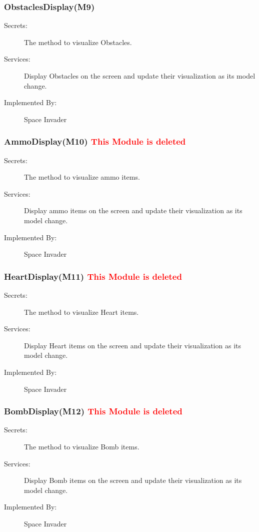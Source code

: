 \documentclass[12pt]{article}
\begin{document}
\subsubsection{ObstaclesDisplay(M9)}
\begin{description}
\item[Secrets:] The method to visualize Obstacles.
\item[Services:] Display Obstacles on the screen and update their visualization as its model change.
\item[Implemented By:] Space Invader
\end{description}

\subsubsection{AmmoDisplay(M10) \textcolor{red}{This Module is deleted}}
\begin{description}
\item[Secrets:] The method to visualize ammo items.
\item[Services:] Display ammo items on the screen and update their visualization as its model change.
\item[Implemented By:] Space Invader
\end{description}

\subsubsection{HeartDisplay(M11) \textcolor{red}{This Module is deleted}}
\begin{description}
\item[Secrets:] The method to visualize Heart items.
\item[Services:] Display Heart items on the screen and update their visualization as its model change.
\item[Implemented By:] Space Invader
\end{description}

\subsubsection{BombDisplay(M12) \textcolor{red}{This Module is deleted}}
\begin{description}
\item[Secrets:] The method to visualize Bomb items.
\item[Services:] Display Bomb items on the screen and update their visualization as its model change.
\item[Implemented By:] Space Invader
\end{description}
\end{document}
